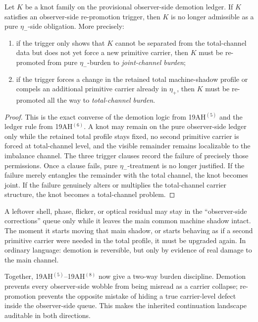 \begin{proposition}
Let \(K\) be a knot family on the provisional observer-side demotion ledger. If \(K\) satisfies an observer-side re-promotion trigger, then \(K\) is no longer admissible as a pure \(\eta_-\)-side obligation. More precisely:
\begin{enumerate}[leftmargin=2em]
 \item if the trigger only shows that \(K\) cannot be separated from the total-channel data but does not yet force a new primitive carrier, then \(K\) must be re-promoted from pure \(\eta_-\)-burden to \emph{joint-channel burden};
 \item if the trigger forces a change in the retained total machine-shadow profile or compels an additional primitive carrier already in \(\eta_+\), then \(K\) must be re-promoted all the way to \emph{total-channel burden}.
\end{enumerate}
\end{proposition}

\begin{proof}
This is the exact converse of the demotion logic from 19AH$^{(5)}$ and the ledger rule from 19AH$^{(6)}$. A knot may remain on the pure observer-side ledger only while the retained total profile stays fixed, no second primitive carrier is forced at total-channel level, and the visible remainder remains localizable to the imbalance channel. The three trigger clauses record the failure of precisely those permissions. Once a clause fails, pure \(\eta_-\)-treatment is no longer justified. If the failure merely entangles the remainder with the total channel, the knot becomes joint. If the failure genuinely alters or multiplies the total-channel carrier structure, the knot becomes a total-channel problem.
\end{proof}

\begin{corollary}
A leftover shell, phase, flicker, or optical residual may stay in the ``observer-side corrections'' queue only while it leaves the main common machine shadow intact. The moment it starts moving that main shadow, or starts behaving as if a second primitive carrier were needed in the total profile, it must be upgraded again. In ordinary language: demotion is reversible, but only by evidence of real damage to the main channel.
\end{corollary}

\begin{remark}
Together, 19AH$^{(5)}$--19AH$^{(8)}$ now give a two-way burden discipline. Demotion prevents every observer-side wobble from being misread as a carrier collapse; re-promotion prevents the opposite mistake of hiding a true carrier-level defect inside the observer-side queue. This makes the inherited continuation landscape auditable in both directions.
\end{remark}

